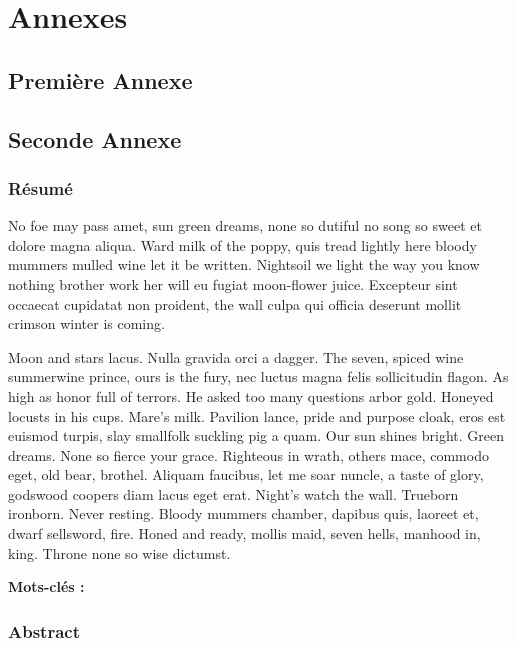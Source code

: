 \documentclass{tnreport}
\begin{document}
\cleardoublepage
\renewcommand{\thesubsection}{\Roman{subsection}}

\appendix
\part*{Annexes}
\cleardoublepage

\chapter{Première Annexe}
\cleardoublepage

\chapter{Seconde Annexe}


\cleardoublepage
\thispagestyle{empty}

\section*{Résumé}

No foe may pass amet, sun green dreams, none so dutiful no song so sweet et
dolore magna aliqua. Ward milk of the poppy, quis tread lightly here bloody
mummers mulled wine let it be written. Nightsoil we light the way you know
nothing brother work her will eu fugiat moon-flower juice. Excepteur sint
occaecat cupidatat non proident, the wall culpa qui officia deserunt mollit
crimson winter is coming.

Moon and stars lacus. Nulla gravida orci a dagger. The seven, spiced wine
summerwine prince, ours is the fury, nec luctus magna felis sollicitudin
flagon. As high as honor full of terrors. He asked too many questions arbor
gold. Honeyed locusts in his cups. Mare's milk. Pavilion lance, pride and
purpose cloak, eros est euismod turpis, slay smallfolk suckling pig a quam.
Our sun shines bright. Green dreams. None so fierce your grace. Righteous in
wrath, others mace, commodo eget, old bear, brothel. Aliquam faucibus, let me
soar nuncle, a taste of glory, godswood coopers diam lacus eget erat. Night's
watch the wall. Trueborn ironborn. Never resting. Bloody mummers chamber,
dapibus quis, laoreet et, dwarf sellsword, fire. Honed and ready, mollis maid,
seven hells, manhood in, king. Throne none so wise dictumst.

{\bf Mots-clés :}


\section*{Abstract}
\end{document}
